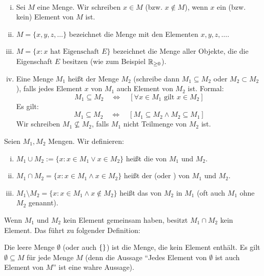 \begin{definition}[Teilmenge]
	\label{def:I.2.3}
	\mbox{} \\[-1.4cm]
	\begin{enumerate}[(i)]
		\item Sei $M$ eine Menge.
		Wir schreiben $x \in M$ (bzw. $x \notin M$), wenn $x$ ein (bzw. kein) Element von $M$ ist.
		\item $M = \{x,y,z,\dots\}$ bezeichnet die Menge mit den Elementen $x,y,z,\dots$.
		\item $M = \{x : x \text{ hat Eigenschaft } E\}$ bezeichnet die Menge aller Objekte, die die Eigenschaft $E$ besitzen (wie zum Beispiel $\mathbb{R}_{\geq 0}$).
		\item Eine Menge $M_1$ heißt  der Menge $M_2$ (schreibe dann $M_1 \subseteq M_2$ oder $M_2 \subset M_2$), falls jedes Element $x$ von $M_1$ auch Element von $M_2$ ist.
		Formal:
		\[
			M_1 \subseteq M_2 \quad \Leftrightarrow \quad [\forall x \in M_1 \text{ gilt } x \in M_2]
		\]
		Es gilt:
		\[
			M_1 \subseteq M_2 \quad \Leftrightarrow \quad [M_1 \subseteq M_2 \wedge M_2 \subseteq M_1]
		\]
		Wir schreiben $M_1 \nsubseteq M_2$, falls $M_1$ nicht Teilmenge von $M_2$ ist.
	\end{enumerate}
\end{definition}
\newpage
\begin{definition}
	\label{def:I.2.4}
	Seien $M_1, M_2$ Mengen.
	Wir definieren:
	\begin{enumerate}[(i)]
		\item $M_1 \cup M_2 := \{x : x \in M_1 \vee x \in M_2\}$ heißt die  von $M_1$ und $M_2$.
		\item $M_1 \cap M_2 = \{x : x \in M_1 \wedge x \in M_2\}$ heißt der  (oder ) von $M_1$ und $M_2$.
		\item $M_1 \setminus M_2 = \{x : x \in M_1 \wedge x \notin M_2\}$ heißt das  von $M_2$ in $M_1$ (oft auch  $M_1$ ohne $M_2$ genannt).
	\end{enumerate}
\end{definition}

Wenn $M_1$ und $M_2$ kein Element gemeinsam haben, besitzt $M_1 \cap M_2$ kein Element.
Das führt zu folgender Definition:

\begin{definition}
	\label{def:I.2.5}
	Die leere Menge $\emptyset$ (oder auch $\left\{\right\}$) ist die Menge, die kein Element enthält.
	Es gilt $\emptyset \subseteq M$ für jede Menge $M$ (denn die Aussage \enquote{Jedes Element von $\emptyset$ ist auch Element von $M$} ist eine wahre Aussage).
\end{definition}

